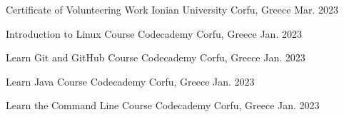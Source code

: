 \begin{cventries}

  \cventry
    {Certificate of Volunteering Work} %
    {Ionian University} %
    {Corfu, Greece} %
    {Mar. 2023} %
    {
      \begin{cvitems} %
      \end{cvitems}
    }


  \cventry
    {Introduction to Linux Course} %
    {Codecademy} %
    {Corfu, Greece} %
    {Jan. 2023} %
    {
      \begin{cvitems} %
      \end{cvitems}
    }


  \cventry
    {Learn Git and GitHub Course} %
    {Codecademy} %
    {Corfu, Greece} %
    {Jan. 2023} %
    {
      \begin{cvitems} %
      \end{cvitems}
    }


  \cventry
    {Learn Java Course} %
    {Codecademy} %
    {Corfu, Greece} %
    {Jan. 2023} %
    {
      \begin{cvitems} %
      \end{cvitems}
    }


  \cventry
    {Learn the Command Line Course} %
    {Codecademy} %
    {Corfu, Greece} %
    {Jan. 2023} %
    {
      \begin{cvitems} %
      \end{cvitems}
    }



\end{cventries}
